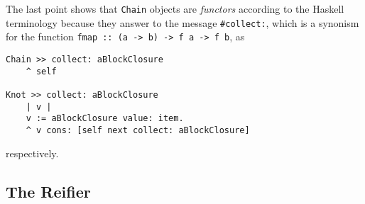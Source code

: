 \documentclass[a4paper,11pt]{article}
\begin{document}
The last point shows that \Verb|Chain| objects are \textit{functors} according
to the Haskell terminology because they answer to the message \Verb|#collect:|,
which is a synonism for the function \Verb|fmap :: (a -> b) -> f a -> f b|, as
\begin{verbatim}
Chain >> collect: aBlockClosure
    ^ self

Knot >> collect: aBlockClosure
    | v |
    v := aBlockClosure value: item.
    ^ v cons: [self next collect: aBlockClosure]
\end{verbatim}
respectively.

\subsection{The Reifier}
\end{document}
